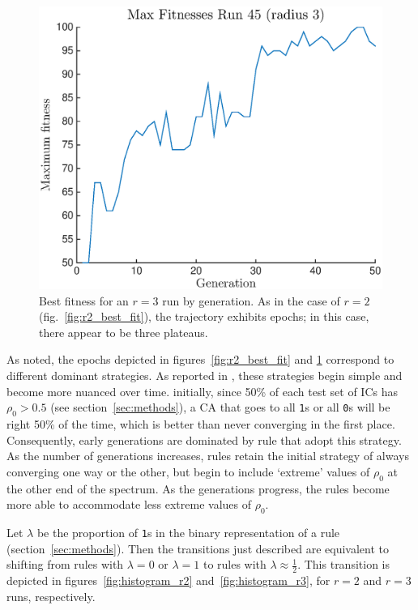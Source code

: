 \begin{figure} [ht]
\begin{center}
\includegraphics[width=\linewidth]{figures/max_epoch_radius3.eps}
\caption{Best fitness for an $r = 3$ run by generation. As in the case of $r = 2$ (fig.~\ref{fig:r2_best_fit}), the trajectory exhibits epochs; in this case, there appear to be three plateaus.}
\label{fig:r3_best_fit}
\end{center}
\end{figure}

As noted, the epochs depicted in figures~\ref{fig:r2_best_fit} and \ref{fig:r3_best_fit} correspond to different dominant strategies. As reported in 
\cite{Mitchell:1994:ECA:186092.186116}, these strategies begin simple and become more nuanced over time. initially, since 50\% of each test set of ICs 
has $\rho_0 > 0.5$ (see section~\ref{sec:methods}), a CA that goes to all \texttt{1}s or all \texttt{0}s will be right 50\% of the time, which is better than never converging in the first place. Consequently, early generations are dominated by rule that adopt this strategy. As the number of generations increases, 
rules retain the initial strategy of always converging one way or the other, but begin to include `extreme' values of $\rho_0$ at the other end of the spectrum. 
As the generations progress, the rules become more able to accommodate less extreme values of $\rho_0$.

Let $\lambda$ be the proportion of \texttt{1}s in the binary representation of a rule (section~\ref{sec:methods}). Then the transitions just described are 
equivalent to shifting from rules with $\lambda = 0$ or $\lambda = 1$ to rules with $\lambda \approx \frac{1}{2}$. This transition is depicted in 
figures~\ref{fig:histogram_r2} and~\ref{fig:histogram_r3}, for $r = 2$ and $r = 3$ runs, respectively.

